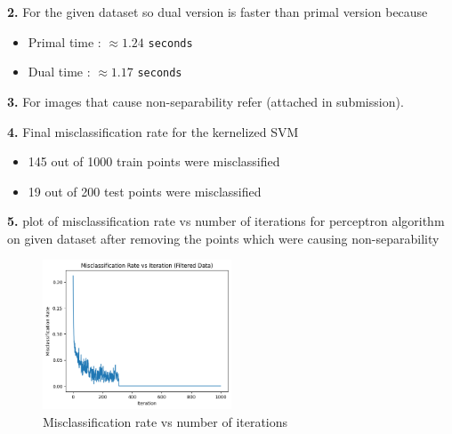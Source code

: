 \documentclass{article}
\begin{document}
\begin{itemize}
\newpage
    \textbf{2.} For the given dataset so dual version is faster than primal version because 
    \begin{itemize}
        \item Primal time : $\approx 1.24$  \texttt{seconds}
        \item Dual time : $\approx 1.17$  \texttt{seconds}
    \end{itemize}

    \textbf{3.} For images that cause non-separability refer  (attached in submission).

    \textbf{4.} Final misclassification rate for the kernelized SVM 
    \begin{itemize}
        \item 145 out of 1000 train points were misclassified
        \item 19 out of 200 test points were misclassified
    \end{itemize}

    \textbf{5.} plot of misclassification rate vs number of iterations for perceptron algorithm on given dataset after removing the points which were causing non-separability
    \begin{figure}[h]
        \centering
        \includegraphics[width=0.5\textwidth]{convergence_misclassification_vs_iterations.png}
        \caption{Misclassification rate vs number of iterations}
    \end{figure}
\end{itemize}
\end{document}
